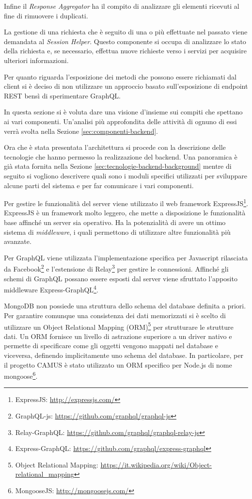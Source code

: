 Infine il \emph{Response Aggregator} ha il compito di analizzare gli elementi ricevuti al fine di rimuovere i duplicati.

La gestione di una richiesta che è seguito di una o più effettuate nel passato viene demandata al \emph{Session Helper}. Questo componente si occupa di analizzare lo stato della richiesta e, se necessario, effettua nuove richieste verso i servizi per acquisire ulteriori informazioni.

Per quanto riguarda l'esposizione dei metodi che possono essere richiamati dal client si è deciso di non utilizzare un approccio basato sull'esposizione di endpoint REST bensì di sperimentare GraphQL.

In questa sezione si è voluta dare una visione d'insieme sui compiti che spettano ai vari componenti. Un'analisi più approfondita delle attività di ognuno di essi verrà svolta nella Sezione \ref{sec:componenti-backend}.

Ora che è stata presentata l'architettura si procede con la descrizione delle tecnologie che hanno permesso la realizzazione del backend. Una panoramica è già stata fornita nella Sezione \ref{sec:tecnologie-backend-background} mentre di seguito si vogliono descrivere quali sono i moduli specifici utilizzati per sviluppare alcune parti del sistema e per far comunicare i vari componenti.

Per gestire le funzionalità del server viene utilizzato il web framework ExpressJS\footnote{ExpressJS: \url{http://expressjs.com/}}. ExpressJS è un framework molto leggero, che mette a disposizione le funzionalità base affinché un server sia operativo. Ha la potenzialità di avere un ottimo sistema di \emph{middleware}, i quali permettono di utilizzare altre funzionalità più avanzate.

Per GraphQL viene utilizzata l'implementazione specifica per Javascript rilasciata da Facebook\footnote{GraphQL-js: \url{https://github.com/graphql/graphql-js}} e l'estensione di Relay\footnote{Relay-GraphQL: \url{https://github.com/graphql/graphql-relay-js}} per gestire le connessioni. Affinché gli schemi di GraphQL possano essere esposti dal server viene sfruttato l'apposito middleware Express-GraphQL\footnote{Express-GraphQL: \url{https://github.com/graphql/express-graphql}}.

MongoDB non possiede una struttura dello schema del database definita a priori. Per garantire comunque una consistenza dei dati memorizzati si è scelto di utilizzare un Object Relational Mapping (ORM)\footnote{Object Relational Mapping: \url{https://it.wikipedia.org/wiki/Object-relational_mapping}} per strutturare le strutture dati. Un ORM fornisce un livello di astrazione superiore a un driver nativo e permette di specificare come gli oggetti vengono mappati nel database e viceversa, definendo implicitamente uno schema del database. In particolare, per il progetto CAMUS è stato utilizzato un ORM specifico per Node.js di nome mongoose\footnote{MongooseJS: \url{http://mongoosejs.com/}}.

